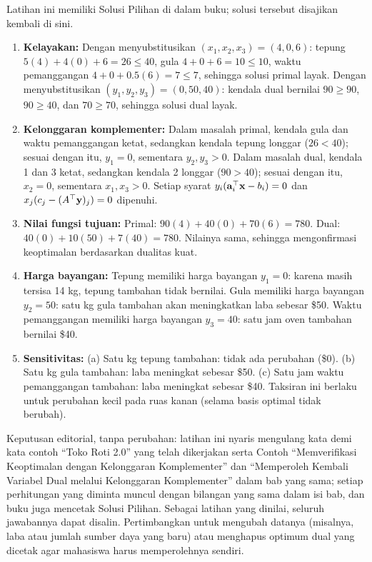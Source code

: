 
Latihan ini memiliki Solusi Pilihan di dalam buku; solusi tersebut disajikan kembali di sini.

\begin{enumerate}
\item \textbf{Kelayakan:} Dengan menyubstitusikan $(x_1, x_2, x_3) = (4, 0, 6)$: tepung $5(4) + 4(0) + 6 = 26 \leq 40$, gula $4 + 0 + 6 = 10 \leq 10$, waktu pemanggangan $4 + 0 + 0.5(6) = 7 \leq 7$, sehingga solusi primal layak. Dengan menyubstitusikan $(y_1, y_2, y_3) = (0, 50, 40)$: kendala dual bernilai $90 \geq 90$, $90 \geq 40$, dan $70 \geq 70$, sehingga solusi dual layak.
\item \textbf{Kelonggaran komplementer:} Dalam masalah primal, kendala gula dan waktu pemanggangan ketat, sedangkan kendala tepung longgar ($26 < 40$); sesuai dengan itu, $y_1 = 0$, sementara $y_2, y_3 > 0$. Dalam masalah dual, kendala 1 dan 3 ketat, sedangkan kendala 2 longgar ($90 > 40$); sesuai dengan itu, $x_2 = 0$, sementara $x_1, x_3 > 0$. Setiap syarat $y_i(\mathbf{a}_i^\top \mathbf{x} - b_i) = 0$ dan $x_j(c_j - (A^\top \mathbf{y})_j) = 0$ dipenuhi.
\item \textbf{Nilai fungsi tujuan:} Primal: $90(4) + 40(0) + 70(6) = 780$. Dual: $40(0) + 10(50) + 7(40) = 780$. Nilainya sama, sehingga mengonfirmasi keoptimalan berdasarkan dualitas kuat.
\item \textbf{Harga bayangan:} Tepung memiliki harga bayangan $y_1 = 0$: karena masih tersisa 14 kg, tepung tambahan tidak bernilai. Gula memiliki harga bayangan $y_2 = 50$: satu kg gula tambahan akan meningkatkan laba sebesar \$50. Waktu pemanggangan memiliki harga bayangan $y_3 = 40$: satu jam oven tambahan bernilai \$40.
\item \textbf{Sensitivitas:} (a) Satu kg tepung tambahan: tidak ada perubahan (\$0). (b) Satu kg gula tambahan: laba meningkat sebesar \$50. (c) Satu jam waktu pemanggangan tambahan: laba meningkat sebesar \$40. Taksiran ini berlaku untuk perubahan kecil pada ruas kanan (selama basis optimal tidak berubah).
\end{enumerate}

\begin{qaflag}
Keputusan editorial, tanpa perubahan: latihan ini nyaris mengulang kata demi kata contoh ``Toko Roti 2.0'' yang telah dikerjakan serta Contoh ``Memverifikasi Keoptimalan dengan Kelonggaran Komplementer'' dan ``Memperoleh Kembali Variabel Dual melalui Kelonggaran Komplementer'' dalam bab yang sama; setiap perhitungan yang diminta muncul dengan bilangan yang sama dalam isi bab, dan buku juga mencetak Solusi Pilihan. Sebagai latihan yang dinilai, seluruh jawabannya dapat disalin. Pertimbangkan untuk mengubah datanya (misalnya, laba atau jumlah sumber daya yang baru) atau menghapus optimum dual yang dicetak agar mahasiswa harus memperolehnya sendiri.
\end{qaflag}

